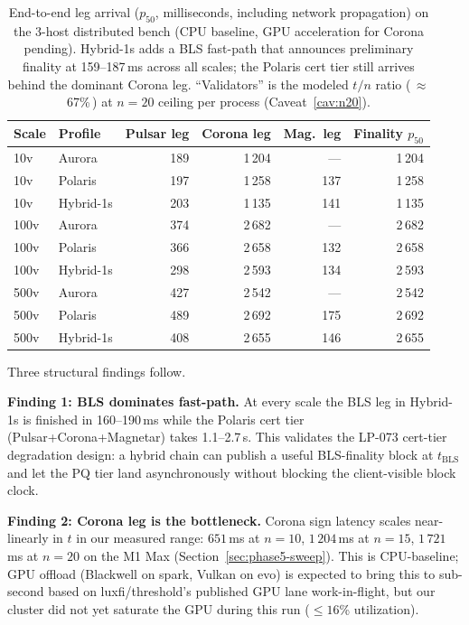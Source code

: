\begin{table}[ht]
\centering
\small
\begin{tabular}{@{}llrrrr@{}}
\toprule
\textbf{Scale} & \textbf{Profile} &
\textbf{Pulsar leg} & \textbf{Corona leg} & \textbf{Mag.\ leg} & \textbf{Finality $p_{50}$} \\
\midrule
10v   & Aurora    & 189 & 1\,204 & ---  & 1\,204 \\
10v   & Polaris   & 197 & 1\,258 & 137  & 1\,258 \\
10v   & Hybrid-1s & 203 & 1\,135 & 141  & 1\,135 \\
100v  & Aurora    & 374 & 2\,682 & ---  & 2\,682 \\
100v  & Polaris   & 366 & 2\,658 & 132  & 2\,658 \\
100v  & Hybrid-1s & 298 & 2\,593 & 134  & 2\,593 \\
500v  & Aurora    & 427 & 2\,542 & ---  & 2\,542 \\
500v  & Polaris   & 489 & 2\,692 & 175  & 2\,692 \\
500v  & Hybrid-1s & 408 & 2\,655 & 146  & 2\,655 \\
\bottomrule
\end{tabular}
\caption{End-to-end leg arrival ($p_{50}$, milliseconds, including
network propagation) on the 3-host distributed bench (CPU baseline,
GPU acceleration for Corona pending). Hybrid-1s adds a BLS fast-path
that announces preliminary finality at 159--187\,ms across all
scales; the Polaris cert tier still arrives behind the dominant
Corona leg. ``Validators'' is the modeled $t/n$ ratio (\,$\approx$67\%\,)
at $n{=}20$ ceiling per process (Caveat~\ref{cav:n20}).}
\label{tab:dist-finality}
\end{table}

Three structural findings follow.

\textbf{Finding 1: BLS dominates fast-path.} At every scale the
BLS leg in Hybrid-1s is finished in 160--190\,ms while the
Polaris cert tier (Pulsar+Corona+Magnetar) takes 1.1--2.7\,s.
This validates the LP-073 cert-tier degradation design: a hybrid
chain can publish a useful BLS-finality block at $t_{\text{BLS}}$ and let
the PQ tier land asynchronously without blocking the client-visible
block clock.

\textbf{Finding 2: Corona leg is the bottleneck.} Corona sign
latency scales near-linearly in $t$ in our measured range:
$651$\,ms at $n{=}10$, $1\,204$\,ms at $n{=}15$, $1\,721$\,ms at
$n{=}20$ on the M1 Max (Section~\ref{sec:phase5-sweep}). This is
CPU-baseline; GPU offload (Blackwell on spark, Vulkan on evo) is
expected to bring this to sub-second based on luxfi/threshold's
published GPU lane work-in-flight, but our cluster did not yet
saturate the GPU during this run ($\leq 16$\% utilization).

